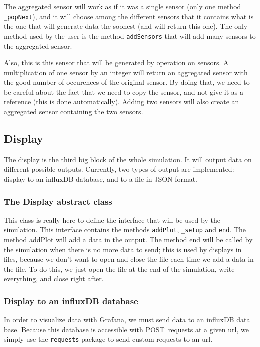 The aggregated sensor will work as if it was a single sensor (only one
method \verb!_popNext!), and it will choose among the different sensors
that it contains what is the one that will generate data the soonest
(and will return this one). The only method used by the user is the method
\verb!addSensors! that will add many sensors to the aggregated sensor.

Also, this is this sensor that will be generated by operation on sensors. A
multiplication of one sensor by an integer will return an aggregated sensor
with the good number of occurences of the original sensor. By doing that, we
need to be careful about the fact that we need to copy the sensor, and not give
it as a reference (this is done automatically). Adding two sensors will also
create an aggregated sensor containing the two sensors.

\subsection{Display}

The display is the third big block of the whole simulation. It will output data
on different possible outputs. Currently, two types of output are implemented:
display to an influxDB database, and to a file in JSON format.

\subsubsection{The Display abstract class}

This class is really here to define the interface that will be used
by the simulation. This interface contains the methods \verb!addPlot!,
\verb!_setup! and \verb!end!. The method addPlot will add a data in the
output. The method end will be called by the simulation when there is no more
data to send; this is used by displays in files, because we don't want to open
and close the file each time we add a data in the file. To do this, we just
open the file at the end of the simulation, write everything, and close right
after.

\subsubsection{Display to an influxDB database}

In order to visualize data with Grafana, we must send data to an influxDB data
base. Because this database is accessible with POST requests at a given url, we
simply use the \verb!requests! package to send custom requests to an url.

